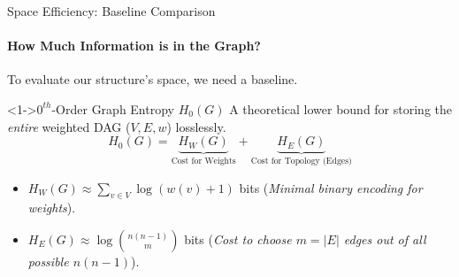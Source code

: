 \begin{frame}{Space Efficiency: Baseline Comparison}
    \framesubtitle{How Much Information is in the Graph?}
    To evaluate our structure's space, \alert{we need a baseline}.
    \begin{block}<1->{$0^{th}$-Order Graph Entropy $H_0(G)$}
        A theoretical lower bound for storing the \emph{entire} weighted DAG ($V, E, w$) losslessly.
        \[ H_0(G) = \underbrace{H_W(G)}_{\text{Cost for Weights}} + \underbrace{H_E(G)}_{\text{Cost for Topology (Edges)}} \]
    \end{block}
    \begin{itemize}
        \item<2-> $H_W(G) \approx \sum_{v \in V} \log(w(v)+1)$ bits (\emph{Minimal binary encoding for weights}).
        \item<3-> $H_E(G) \approx \log \binom{n(n-1)}{m}$ bits (\emph{Cost to choose $m=|E|$ edges out of all possible $n(n-1)$}).
    \end{itemize}
    \vspace{0.5em}

\end{frame}

